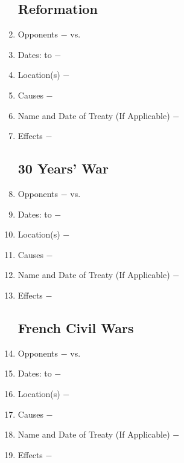 \documentclass[12pt]{article}
\begin{document}
\begin{enumerate}
\subsection{Reformation} 

\item Opponents $-$ vs.

\item Dates: to $-$

\item Location(s) $-$ 

\item Causes $-$

\item Name and Date of Treaty (If Applicable) $-$ 

\item Effects $-$ 

\subsection{30 Years' War}

\item Opponents $-$ vs.

\item Dates: to $-$

\item Location(s) $-$ 

\item Causes $-$

\item Name and Date of Treaty (If Applicable) $-$ 

\item Effects $-$

\subsection{French Civil Wars}
 
\item Opponents $-$ vs.

\item Dates: to $-$

\item Location(s) $-$ 

\item Causes $-$

\item Name and Date of Treaty (If Applicable) $-$ 

\item Effects $-$


\end{enumerate}
\end{document}
